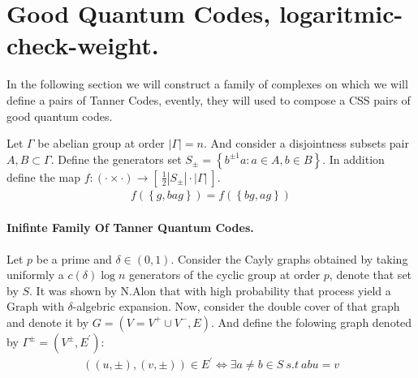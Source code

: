 \section{Good Quantum Codes, logaritmic-check-weight.} 
In the following section we will construct a family of complexes on which we will define a pairs of Tanner Codes, evently, they will used to compose a CSS pairs of good quantum codes.  

\begin{definition}
  Let $\Gamma$ be abelian group at order $|\Gamma| = n$. And consider a disjointness subsets pair $A,B \subset \Gamma$. Define the generators set $S_{\pm}  = \left\{ b^{\pm 1} a : a \in A, b \in B   \right\}$. In addition define the map $f : \left( \cdot \times \cdot \right) \rightarrow \left[ \ \frac{1}{2} |S_{\pm}| \cdot |\Gamma|  \ \right]  $. 
\begin{equation*}
  \begin{split}
    f\left( \left\{ g, ba g  \right\}  \right)= f\left( \left\{ bg, ag  \right\}  \right)
  \end{split}
\end{equation*}
\end{definition}



\paragraph{Inifinte Family Of Tanner Quantum Codes.} 
Let $p$ be a prime and $\delta \in \left( 0,1 \right)$. Consider the Cayly graphs obtained by taking uniformly a $c\left( \delta \right)\log n$ generators of the cyclic group at order $p$, denote that set by $S$. It was shown by N.Alon  that with high probability that process yield a Graph with $\delta$-algebric expansion. Now, consider the double cover of that graph and denote it by $G = \left( V = V^{+} \cup V^{-},E \right)$. And define the folowing graph denoted by $\Gamma^{\pm} = \left(V^{\pm}, E^{\prime}\right)$:
\begin{equation*}
  \begin{split}
    \left( \left(u , \pm  \right), \left( v, \pm \right) \right) \in  E^{\prime} \Leftrightarrow \exists a\neq b \in S \ s.t \ abu = v     
  \end{split}
\end{equation*}

